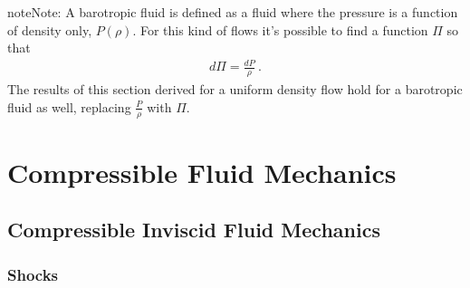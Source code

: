 \documentclass[letterpaper,10pt,english]{jupyterBook}
\begin{document}
\begin{sphinxadmonition}{note}{Note:}
\sphinxAtStartPar
A barotropic fluid is defined as a fluid where the pressure is a function of density only, \(P(\rho)\). For this kind of flows it’s possible to find a function \(\Pi\) so that
\begin{equation*}
\begin{split}d \Pi = \frac{d P}{\rho} \ .\end{split}
\end{equation*}
\sphinxAtStartPar
The results of this section derived for a uniform density flow hold for a barotropic fluid as well, replacing \(\frac{P}{\rho}\) with \(\Pi\).
\end{sphinxadmonition}

\sphinxstepscope


\chapter{Compressible Fluid Mechanics}
\label{\detokenize{ch/fluids/compressible:compressible-fluid-mechanics}}\label{\detokenize{ch/fluids/compressible:fluid-mechanics-compressible}}\label{\detokenize{ch/fluids/compressible::doc}}

\section{Compressible Inviscid Fluid Mechanics}
\label{\detokenize{ch/fluids/compressible:compressible-inviscid-fluid-mechanics}}\label{\detokenize{ch/fluids/compressible:fluid-mechanics-compressible-invisid}}

\subsection{Shocks}
\label{\detokenize{ch/fluids/compressible:shocks}}\label{\detokenize{ch/fluids/compressible:fluid-mechanics-compressible-invisid-shocks}}
\end{document}

